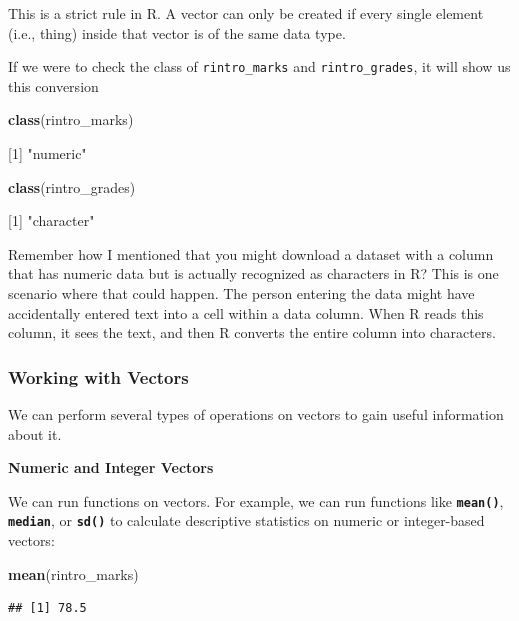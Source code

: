 \documentclass[
]{book}
\newenvironment{Shaded}{\begin{snugshade}}{\end{snugshade}}
\newcommand{\DecValTok}[1]{\textcolor[rgb]{0.00,0.00,0.81}{#1}}
\newcommand{\FunctionTok}[1]{\textcolor[rgb]{0.13,0.29,0.53}{\textbf{#1}}}
\newcommand{\NormalTok}[1]{#1}
\newcommand{\StringTok}[1]{\textcolor[rgb]{0.31,0.60,0.02}{#1}}
\begin{document}
This is a strict rule in R. A vector can only be created if every single element (i.e., thing) inside that vector is of the same data type.

If we were to check the class of \texttt{rintro\_marks} and \texttt{rintro\_grades}, it will show us this conversion

\begin{Shaded}
\begin{Highlighting}[]
\FunctionTok{class}\NormalTok{(rintro\_marks) }

\NormalTok{[}\DecValTok{1}\NormalTok{] }\StringTok{"numeric"}


\FunctionTok{class}\NormalTok{(rintro\_grades)}

\NormalTok{[}\DecValTok{1}\NormalTok{] }\StringTok{"character"}
\end{Highlighting}
\end{Shaded}

Remember how I mentioned that you might download a dataset with a column that has numeric data but is actually recognized as characters in R? This is one scenario where that could happen. The person entering the data might have accidentally entered text into a cell within a data column. When R reads this column, it sees the text, and then R converts the entire column into characters.

\subsubsection{Working with Vectors}\label{working-with-vectors}

We can perform several types of operations on vectors to gain useful information about it.

\textbf{Numeric and Integer Vectors}

We can run functions on vectors. For example, we can run functions like \textbf{\texttt{mean()}}, \textbf{\texttt{median}}, or \textbf{\texttt{sd()}} to calculate descriptive statistics on numeric or integer-based vectors:

\begin{Shaded}
\begin{Highlighting}[]
\FunctionTok{mean}\NormalTok{(rintro\_marks)}
\end{Highlighting}
\end{Shaded}

\begin{verbatim}
## [1] 78.5
\end{verbatim}
\end{document}
